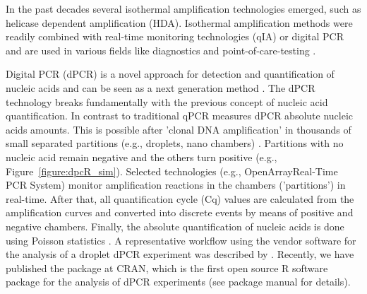In the past decades several isothermal amplification technologies emerged, such 
as helicase dependent amplification (HDA). Isothermal 
amplification methods were readily combined with real-time monitoring technologies (qIA) 
or digital PCR and are used in various fields like diagnostics and 
point-of-care-testing \citep{selck_2013, rodiger_nucleic_2014, nixon_2014}.

Digital PCR (dPCR) is a novel approach for detection and quantification of 
nucleic acids and can be seen as a next generation method 
\citep{huggett_qpcr_2015}. The dPCR technology breaks fundamentally with the 
previous concept of nucleic acid quantification. In contrast to traditional qPCR 
measures dPCR absolute nucleic acids amounts. This is possible after 'clonal DNA 
amplification' in thousands of small separated partitions (e.g., droplets, nano 
chambers) \citep{huggett_2013, milbury_2014, morley_2014}. Partitions with no 
nucleic acid remain negative and the others turn positive (e.g., 
Figure~\ref{figure:dpcR_sim}). Selected technologies (e.g., 
OpenArray\textregistered Real-Time PCR System) monitor amplification reactions 
in the chambers ('partitions') in real-time. After that, all quantification 
cycle (Cq) values are calculated from the amplification curves and converted 
into discrete events by means of positive and negative chambers. Finally, the 
absolute quantification of nucleic acids is done using Poisson statistics 
\citep{milbury_2014, morley_2014}. A representative workflow using the vendor 
software for the analysis of a droplet dPCR experiment was described by 
\citet{milbury_2014}. Recently, we have published the  package at 
CRAN, which is the first open source R software package for the analysis of dPCR 
experiments (see  package manual for details).


